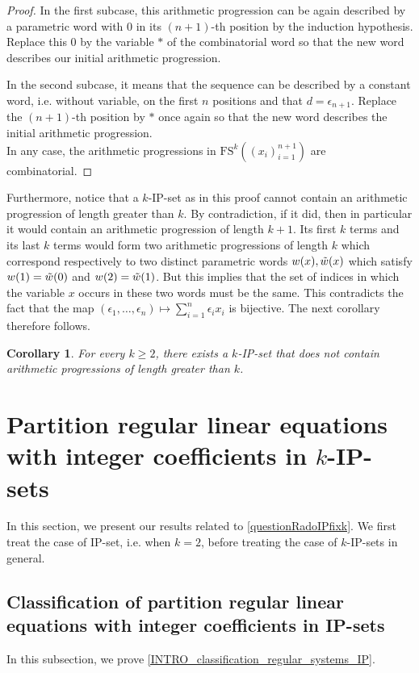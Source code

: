 \documentclass{article}
\theoremstyle{definition}
\theoremstyle{plain}
\newtheorem{corollary}[theorem]{Corollary}
\theoremstyle{remark}
\newcommand{\FS}[2][]{\ensuremath{\mathrm{FS}^{#1}\left(#2\right)}}
\begin{document}
\begin{proof}
    In the first subcase, this arithmetic progression can be again described by a parametric word with 0 in its $(n+1)$-th position by the induction hypothesis. Replace this 0 by the variable $*$ of the combinatorial word so that the new word describes our initial arithmetic progression. 
    
    In the second subcase, it means that the sequence can be described by a constant word, i.e. without variable, on the first $n$ positions and that $d= \epsilon_{n+1}$. Replace the $(n+1)$-th position by $*$ once again so that the new word describes the initial arithmetic progression. \\

    In any case, the arithmetic progressions in $\FS[k]{(x_i)_{i=1}^{n+1}}$ are combinatorial.
    
\end{proof}

Furthermore, notice that a $k$-IP-set as in this proof cannot contain an arithmetic progression of length greater than $k$. By contradiction, if it did, then in particular it would contain an arithmetic progression of length $k+1$. Its first $k$ terms and its last $k$ terms would form two arithmetic progressions of length $k$ which correspond respectively to two distinct parametric words $w(x), \Tilde{w}(x)$ which satisfy $w(1)= \Tilde{w}(0)$ and $w(2)= \Tilde{w}(1)$. But this implies that the set of indices in which the variable $x$ occurs in these two words must be the same. This contradicts the fact that the map $(\epsilon_1,\ldots,\epsilon_n) \mapsto \sum_{i=1}^n \epsilon_i x_i$ is bijective. The next corollary therefore follows.

\begin{corollary}\label{boundedlengthAPinkIPset}
    For every $k\geq 2$, there exists a $k$-IP-set that does not contain arithmetic progressions of length greater than $k$.
\end{corollary}

\section{Partition regular linear equations with integer coefficients in \texorpdfstring{$k$}{k}-IP-sets}\label{sectionEQ}
In this section, we present our results related to \cref{questionRadoIPfixk}. We first treat the case of IP-set, i.e. when $k=2$, before treating the case of $k$-IP-sets in general.

\subsection{Classification of partition regular linear equations with integer coefficients in IP-sets}\label{subsectionREGEQIP}
In this subsection, we prove \cref{INTRO_classification_regular_systems_IP}.\\
\end{document}
